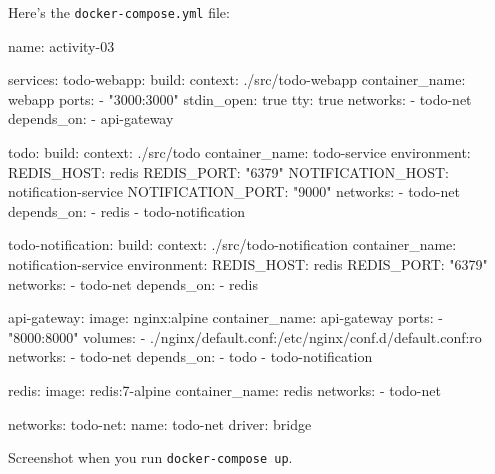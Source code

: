 \documentclass[a4paper, 10pt]{article}
\begin{document}
\begin{solution}
	Here's the \texttt{docker-compose.yml} file:
	\begin{codingbox*}[language=YAML]
name: activity-03

services:
  todo-webapp:
    build:
      context: ./src/todo-webapp
    container_name: webapp
    ports:
      - "3000:3000"
    stdin_open: true
    tty: true
    networks:
      - todo-net
    depends_on:
      - api-gateway

  todo:
    build:
      context: ./src/todo
    container_name: todo-service
    environment:
      REDIS_HOST: redis
      REDIS_PORT: "6379"
      NOTIFICATION_HOST: notification-service
      NOTIFICATION_PORT: "9000"
    networks:
      - todo-net
    depends_on:
      - redis
      - todo-notification

  todo-notification:
    build:
      context: ./src/todo-notification
    container_name: notification-service
    environment:
      REDIS_HOST: redis
      REDIS_PORT: "6379"
    networks:
      - todo-net
    depends_on:
      - redis

  api-gateway:
    image: nginx:alpine
    container_name: api-gateway
    ports:
      - "8000:8000"
    volumes:
      - ./nginx/default.conf:/etc/nginx/conf.d/default.conf:ro
    networks:
      - todo-net
    depends_on:
      - todo
      - todo-notification

  redis:
    image: redis:7-alpine
    container_name: redis
    networks:
      - todo-net

networks:
  todo-net:
    name: todo-net
    driver: bridge
\end{codingbox*}
\end{solution}

\begin{problem}
Screenshot when you run \texttt{docker-compose up}.
\end{problem}

\begin{solution}
\end{solution}
\end{document}

